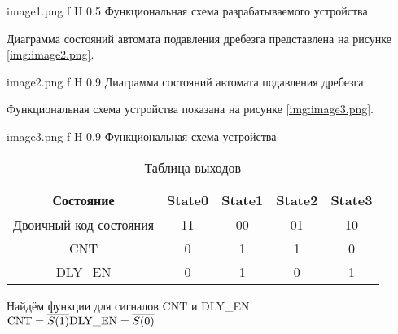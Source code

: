 \documentclass{bmstu}
\begin{document}
	{image1.png}
	{f}
	{H}
	{0.5\textwidth}
	{Функциональная схема разрабатываемого устройства}

Диаграмма состояний автомата подавления дребезга представлена на рисунке \ref{img:image2.png}.

	{image2.png}
	{f}
	{H}
	{0.9\textwidth}
	{Диаграмма состояний автомата подавления дребезга}

Функциональная схема устройства показана на рисунке \ref{img:image3.png}.

	{image3.png}
	{f}
	{H}
	{0.9\textwidth}
	{Функциональная схема устройства}
	
	
\begin{table}[ht]
	\begin{center}
	\caption{Таблица выходов}
	\begin{tabular}{|c|c|c|c|c|}
		\hline
		Состояние & State0 & State1 & State2 & State3\\
		\hline
		Двоичный код состояния & 11     & 00     & 01     & 10\\
		\hline
		CNT        & 0      & 1      & 1      & 0\\
		\hline
		DLY\_EN    & 0      & 1      & 0      & 1 \\
		\hline
	\end{tabular}
	\end{center}
\end{table}

Найдём функции для сигналов CNT и DLY\_EN. \\

$	\text{CNT} = \overline{S(1)}\\
	\text{DLY\_EN} = \overline{S(0)}
$
\end{document}
